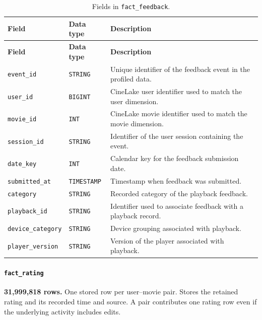 \documentclass[a4paper,12pt]{article}
\newcommand{\dbsep}{\_\allowbreak}
\begin{document}
\begingroup
\small
\setlength{\tabcolsep}{4pt}
\renewcommand{\arraystretch}{1.1}
\begin{longtable}{@{}>{\raggedright\arraybackslash}p{}
                    >{\raggedright\arraybackslash}p{}
                    >{\raggedright\arraybackslash}p{}@{}}
\caption{Fields in \texttt{fact\dbsep feedback}.}\\
\toprule
\textbf{Field} & \textbf{Data type} & \textbf{Description}\\
\midrule
\endfirsthead
\toprule
\textbf{Field} & \textbf{Data type} & \textbf{Description}\\
\midrule
\endhead
\bottomrule
\endfoot
\texttt{event\dbsep id} & \texttt{STRING} & Unique identifier of the feedback event in the profiled data.\\
\texttt{user\dbsep id} & \texttt{BIGINT} & CineLake user identifier used to match the user dimension.\\
\texttt{movie\dbsep id} & \texttt{INT} & CineLake movie identifier used to match the movie dimension.\\
\texttt{session\dbsep id} & \texttt{STRING} & Identifier of the user session containing the event.\\
\texttt{date\dbsep key} & \texttt{INT} & Calendar key for the feedback submission date.\\
\texttt{submitted\dbsep at} & \texttt{TIMESTAMP} & Timestamp when feedback was submitted.\\
\texttt{category} & \texttt{STRING} & Recorded category of the playback feedback.\\
\texttt{playback\dbsep id} & \texttt{STRING} & Identifier used to associate feedback with a playback record.\\
\texttt{device\dbsep category} & \texttt{STRING} & Device grouping associated with playback.\\
\texttt{player\dbsep version} & \texttt{STRING} & Version of the player associated with playback.\\
\end{longtable}
\endgroup

\paragraph{\texttt{fact\dbsep rating}}
\textbf{31,999,818 rows.} One stored row per user--movie pair.
Stores the retained rating and its recorded time and source. A pair contributes one rating row even if the underlying activity includes edits.
\end{document}
